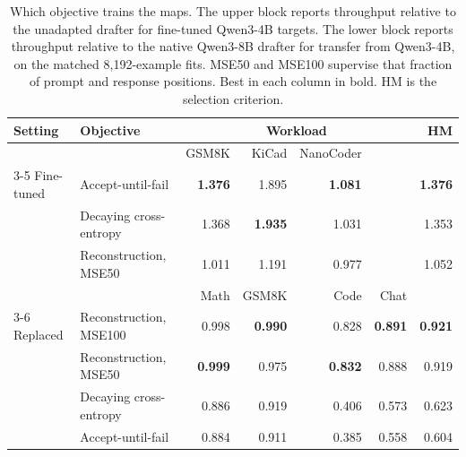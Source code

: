 \begin{table}[t]
\centering
\caption{Which objective trains the maps. The upper block reports throughput relative to the unadapted drafter for fine-tuned Qwen3-4B targets. The lower block reports throughput relative to the native Qwen3-8B drafter for transfer from Qwen3-4B, on the matched 8{,}192-example fits. MSE50 and MSE100 supervise that fraction of prompt and response positions. Best in each column in bold. HM is the selection criterion.}
\label{tab:ablation-objective}
\small
\begin{tabular}{llrrrrr}
\toprule
Setting & Objective & \multicolumn{4}{c}{Workload} & HM \\
\midrule
 & & GSM8K & KiCad & NanoCoder & & \\
\cmidrule(lr){3-5}
Fine-tuned & Accept-until-fail & \textbf{1.376} & 1.895 & \textbf{1.081} & & \textbf{1.376} \\
 & Decaying cross-entropy & 1.368 & \textbf{1.935} & 1.031 & & 1.353 \\
 & Reconstruction, MSE50 & 1.011 & 1.191 & 0.977 & & 1.052 \\
\midrule
 & & Math & GSM8K & Code & Chat & \\
\cmidrule(lr){3-6}
Replaced & Reconstruction, MSE100 & 0.998 & \textbf{0.990} & 0.828 & \textbf{0.891} & \textbf{0.921} \\
 & Reconstruction, MSE50 & \textbf{0.999} & 0.975 & \textbf{0.832} & 0.888 & 0.919 \\
 & Decaying cross-entropy & 0.886 & 0.919 & 0.406 & 0.573 & 0.623 \\
 & Accept-until-fail & 0.884 & 0.911 & 0.385 & 0.558 & 0.604 \\
\bottomrule
\end{tabular}
\end{table}

